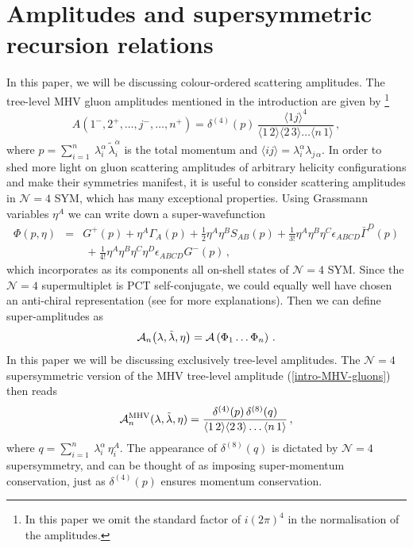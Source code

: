 \documentclass[12pt]{article}
\def \be  {\begin{equation}}
\def \ee  {\end{equation}}
\def \ba  {\begin{eqnarray}}
\def \ea  {\end{eqnarray}}
\newcommand \vev [1] {\langle{#1}\rangle}
\begin{document}
\section{Amplitudes and supersymmetric recursion relations}\label{sect-technicalities}

In this paper, we will be discussing colour-ordered scattering amplitudes.
The tree-level MHV gluon amplitudes mentioned in the introduction
are given by \cite{Parke:1986gb,Berends:1987me} \footnote{In this
paper we omit the standard factor of $i (2 \pi)^4$ in the
normalisation of the amplitudes.} \be \label{intro-MHV-gluons}
A(1^{-},2^{+},\ldots,j^{-},\ldots,n^{+}) =   \delta^{(4)}(p)\,
\frac{\langle 1 j\rangle^4}{\vev{1\, 2}\vev{2\, 3}\ldots\vev{n\,
1}}\,, \ee where $p=\sum_{i=1}^n\ \lambda_{i}^{\alpha}\,
    \tilde\lambda_{i}^{\dot\alpha}$ is the total momentum and $\vev{ij}=\lambda_{i}^{\alpha} \lambda_{j\,\alpha}$.
In order to shed more light on gluon scattering amplitudes of
arbitrary helicity configurations and make their symmetries
manifest, it is useful to consider scattering amplitudes in
$\mathcal{N}=4$ SYM, which has many exceptional properties.
Using Grassmann variables $\eta^{A}$ we can write down a super-wavefunction
\ba \label{super-wave}
  \Phi(p,\eta) &=& G^{+}(p) + \eta^A \Gamma_A(p) + \frac{1}{2}\eta^A \eta^B S_{AB}(p)
  + \frac{1}{3!}\eta^A\eta^B\eta^C \epsilon_{ABCD} \bar\Gamma^{D}(p) \nonumber \\
  &&\  + \frac{1}{4!}\eta^A\eta^B\eta^C \eta^D \epsilon_{ABCD} G^{-}(p)\,,
\ea
which incorporates as its components all on-shell states of $\mathcal{N}=4$ SYM.
Since the $\mathcal{N}=4$ supermultiplet is PCT self-conjugate, we could equally well have chosen
an anti-chiral representation (see \cite{dhks5,dhks6} for more explanations).
Then we can define super-amplitudes as
\be\label{super-amplitude}
{\cal A}_n\big(\lambda,\tilde{\lambda},\eta\big) = \mathcal{A}\left( \Phi_1 \ldots \Phi_n \right)\,.
\ee
In this paper we will be discussing exclusively tree-level amplitudes.
The $\mathcal{N}=4$  supersymmetric version of the MHV tree-level amplitude
(\ref{intro-MHV-gluons}) then reads \cite{Nair:1988bq} \be
\label{intro-MHV-n}
  {\cal A}^{\rm MHV}_{n}(\lambda,\tilde\lambda,\eta) = \frac{ \delta^{(4)}(p)\,
    \delta^{(8)} (q)}{\vev{1\, 2}\vev{2\, 3}\ldots\vev{n\, 1}}\,,
\ee where $q=\sum_{i=1}^n\ \lambda_{i}^{\alpha}\, \eta^A_i$. The
appearance of $ \delta^{(8)} (q)$ is dictated by ${\mathcal N}=4$
supersymmetry, and can be thought of as imposing super-momentum
conservation, just as $\delta^{(4)}(p)$ ensures momentum
conservation.
\end{document}
